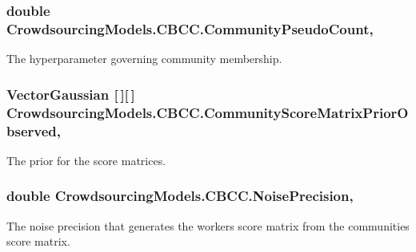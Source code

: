 \subsubsection[{Community\+Pseudo\+Count}]{\setlength{\rightskip}{0pt plus 5cm}double Crowdsourcing\+Models.\+C\+B\+C\+C.\+Community\+Pseudo\+Count\hspace{0.3cm}{\ttfamily [get]}, {\ttfamily [set]}}\label{class_crowdsourcing_models_1_1_c_b_c_c_a2f2892733a8d5e66d64a5795f70c11f5}


The hyperparameter governing community membership. 

\hypertarget{class_crowdsourcing_models_1_1_c_b_c_c_a1ddbd4dcb9e3f9ddba4f8c34ff544aaa}{}
\subsubsection[{Community\+Score\+Matrix\+Prior\+Observed}]{\setlength{\rightskip}{0pt plus 5cm}Vector\+Gaussian \mbox{[}$\,$\mbox{]}\mbox{[}$\,$\mbox{]} Crowdsourcing\+Models.\+C\+B\+C\+C.\+Community\+Score\+Matrix\+Prior\+Observed\hspace{0.3cm}{\ttfamily [get]}, {}}\label{class_crowdsourcing_models_1_1_c_b_c_c_a1ddbd4dcb9e3f9ddba4f8c34ff544aaa}


The prior for the score matrices. 

\hypertarget{class_crowdsourcing_models_1_1_c_b_c_c_acb50efae296073d8f9a3cd67c59a76cb}{}
\subsubsection[{Noise\+Precision}]{\setlength{\rightskip}{0pt plus 5cm}double Crowdsourcing\+Models.\+C\+B\+C\+C.\+Noise\+Precision\hspace{0.3cm}{\ttfamily [get]}, {\ttfamily [set]}}\label{class_crowdsourcing_models_1_1_c_b_c_c_acb50efae296073d8f9a3cd67c59a76cb}


The noise precision that generates the workers score matrix from the communities score matrix. 

